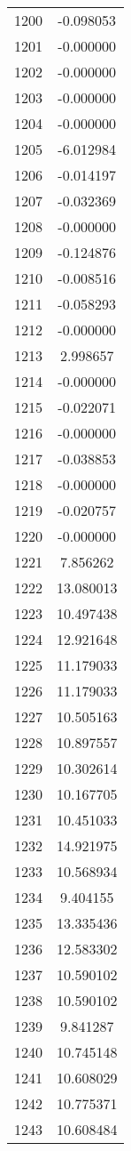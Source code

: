 \documentclass[12pt]{article}
\begin{document}
\begin{longtable}{@{}cc@{}}
1200 & -0.098053 \\
1201 & -0.000000 \\
1202 & -0.000000 \\
1203 & -0.000000 \\
1204 & -0.000000 \\
1205 & -6.012984 \\
1206 & -0.014197 \\
1207 & -0.032369 \\
1208 & -0.000000 \\
1209 & -0.124876 \\
1210 & -0.008516 \\
1211 & -0.058293 \\
1212 & -0.000000 \\
1213 & 2.998657 \\
1214 & -0.000000 \\
1215 & -0.022071 \\
1216 & -0.000000 \\
1217 & -0.038853 \\
1218 & -0.000000 \\
1219 & -0.020757 \\
1220 & -0.000000 \\
1221 & 7.856262 \\
1222 & 13.080013 \\
1223 & 10.497438 \\
1224 & 12.921648 \\
1225 & 11.179033 \\
1226 & 11.179033 \\
1227 & 10.505163 \\
1228 & 10.897557 \\
1229 & 10.302614 \\
1230 & 10.167705 \\
1231 & 10.451033 \\
1232 & 14.921975 \\
1233 & 10.568934 \\
1234 & 9.404155 \\
1235 & 13.335436 \\
1236 & 12.583302 \\
1237 & 10.590102 \\
1238 & 10.590102 \\
1239 & 9.841287 \\
1240 & 10.745148 \\
1241 & 10.608029 \\
1242 & 10.775371 \\
1243 & 10.608484 \\

\end{longtable}
\end{document}
